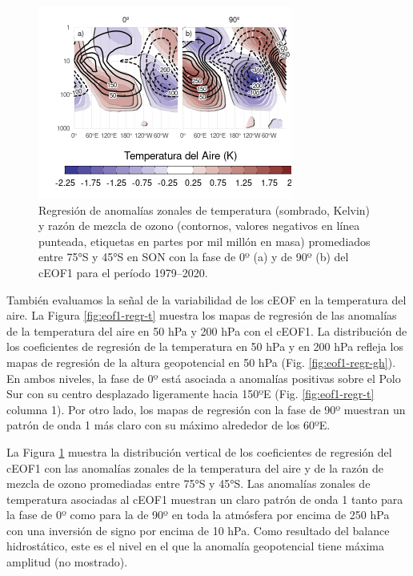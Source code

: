 \documentclass[12pt,oneside]{reedthesis}
\begin{document}
\begin{figure}
\includegraphics{figures/20-ceofs/t-vertical-1} \caption{Regresión de anomalías zonales de temperatura (sombrado, Kelvin) y razón de mezcla de ozono (contornos, valores negativos en línea punteada, etiquetas en partes por mil millón en masa) promediados entre 75°S y 45°S en SON con la fase de 0º (a) y de 90º (b) del cEOF1 para el período 1979--2020.}\label{fig:t-vertical}
\end{figure}

También evaluamos la señal de la variabilidad de los cEOF en la temperatura del aire.
La Figura \ref{fig:eof1-regr-t} muestra los mapas de regresión de las anomalías de la temperatura del aire en 50 hPa y 200 hPa con el cEOF1.
La distribución de los coeficientes de regresión de la temperatura en 50 hPa y en 200 hPa refleja los mapas de regresión de la altura geopotencial en 50 hPa (Fig. \ref{fig:eof1-regr-gh}).
En ambos niveles, la fase de 0º está asociada a anomalías positivas sobre el Polo Sur con su centro desplazado ligeramente hacia 150ºE (Fig. \ref{fig:eof1-regr-t} columna 1).
Por otro lado, los mapas de regresión con la fase de 90º muestran un patrón de onda 1 más claro con su máximo alrededor de los 60ºE.

La Figura \ref{fig:t-vertical} muestra la distribución vertical de los coeficientes de regresión del cEOF1 con las anomalías zonales de la temperatura del aire y de la razón de mezcla de ozono promediadas entre 75°S y 45°S.
Las anomalías zonales de temperatura asociadas al cEOF1 muestran un claro patrón de onda 1 tanto para la fase de 0º como para la de 90º en toda la atmósfera por encima de 250 hPa con una inversión de signo por encima de 10 hPa.
Como resultado del balance hidrostático, este es el nivel en el que la anomalía geopotencial tiene máxima amplitud (no mostrado).
\end{document}
